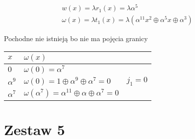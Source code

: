 \documentclass[12pt]{article}
\begin{document}
\begin{multline*}
    & w(x) = \lambda r_1(x) = \lambda\alpha^5 & \\
    & \omega(x) = \lambda t_1(x)  = \lambda (\alpha^{11}x^2\oplus\alpha^5x\oplus \alpha^3) &
\end{multline*}

Pochodne nie istnieją bo nie ma pojęcia granicy 


\begin{table}[h]
\begin{tabular}{lll}
    $x$ & $\omega(x) $& \\ \hline
    $0$ & $ \omega(0)=\alpha^7$ &  \\
    $\alpha^9$ & $\omega(0) = 1 \oplus \alpha^9 \oplus \alpha^7 = 0 $ & $j_1=0$ \\
    $\alpha^7$ & $\omega(\alpha^7) = \alpha^11 \oplus \alpha \oplus \alpha^7 =0 $ & \\
\end{tabular}
\end{table}

\section*{Zestaw 5}
\end{document}
